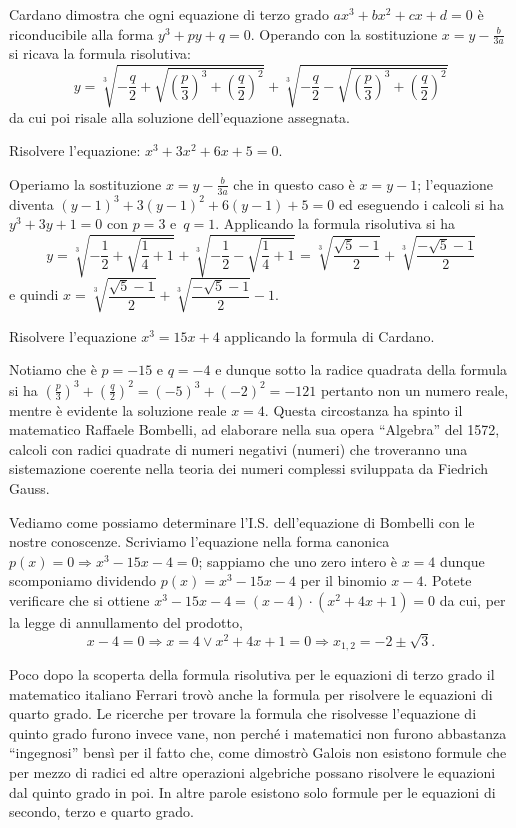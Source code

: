 Cardano dimostra che ogni equazione di terzo grado $ax^3+bx^2+cx+d=0$ è riconducibile alla forma $y^3+{py}+q=0$. Operando con la sostituzione $x=y-\frac b{3a}$ si ricava la formula risolutiva: 
\[y=\sqrt[3]{-\frac q 2+\sqrt{\left(\frac p 3\right)^3+\left(\frac q 2\right)^2}}+\sqrt[3]{-\frac q 2-\sqrt{\left(\frac p 3\right)^3+\left(\frac q 2\right)^2}}\] 
da cui poi risale alla soluzione dell'equazione assegnata.
\begin{exrig}
\begin{esempio}
Risolvere l'equazione: $x^3+3x^2+6x+5=0$.

Operiamo la sostituzione $x=y-\frac b{3a}$ che in questo caso è $x=y-1$; l'equazione diventa $(y-1)^3+3(y-1)^2+6(y-1)+5=0$ ed eseguendo i calcoli si ha $y^3+3y+1=0$ con $p=3$ e~$q=1$.
Applicando la formula risolutiva si ha 
\[y=\sqrt[3]{-\frac 1 2+\sqrt{\frac 1 4+1}}+\sqrt[3]{-\frac 1 2-\sqrt{\frac 1 4+1}}=\sqrt[3]{\frac{\sqrt 5-1} 2}+\sqrt[3]{\frac{-\sqrt 5-1} 2}\] 
e quindi $x=\sqrt[3]{\dfrac{\sqrt 5-1} 2}+\sqrt[3]{\dfrac{-\sqrt 5-1} 2}-1$.
\end{esempio}

\begin{esempio}
Risolvere l’equazione $x^3=15x+4$ applicando la formula di Cardano.

Notiamo che è $p=-15$ e $q=-4$ e dunque sotto la radice quadrata della formula 
si ha $\left(\frac p 3\right)^3+\left(\frac q 2\right)^2=(-5)^3+(-2)^2=-121$ pertanto non un numero
reale, mentre è evidente la soluzione reale $x=4$. Questa circostanza ha spinto il 
matematico Raffaele Bombelli, ad elaborare nella sua opera “Algebra” del 1572, calcoli con radici 
quadrate di numeri negativi (numeri) che troveranno una sistemazione coerente nella teoria dei 
numeri complessi sviluppata da Fiedrich Gauss.

Vediamo come possiamo determinare l’I.S. dell'equazione di Bombelli con le nostre conoscenze. Scriviamo l’equazione nella forma canonica $p(x)=0\Rightarrow x^3-15x-4=0$; sappiamo che uno zero intero è $x=4$ dunque scomponiamo dividendo $p(x)=x^3-15x-4$ per il binomio $x-4$. Potete verificare che si ottiene $x^3-15x-4=(x-4)\cdot (x^2+4x+1)=0$ da cui, per la legge di annullamento del prodotto, 
\[x-4=0\Rightarrow x=4\vee x^2+4x+1=0\Rightarrow x_{1,2}=-2\pm \sqrt 3.\]

Poco dopo la scoperta della formula risolutiva per le equazioni di terzo grado il matematico 
italiano Ferrari trovò anche la formula per risolvere le equazioni di quarto grado. Le ricerche per
trovare la formula che risolvesse l'equazione di quinto grado furono invece vane, non perché i 
matematici non furono abbastanza “ingegnosi” bensì per il fatto che, come dimostrò Galois non 
esistono formule che per mezzo di radici ed altre operazioni algebriche possano risolvere le 
equazioni dal quinto grado in poi. In altre parole esistono solo formule per le equazioni di 
secondo, terzo e quarto grado.


\end{esempio}
\end{exrig}
